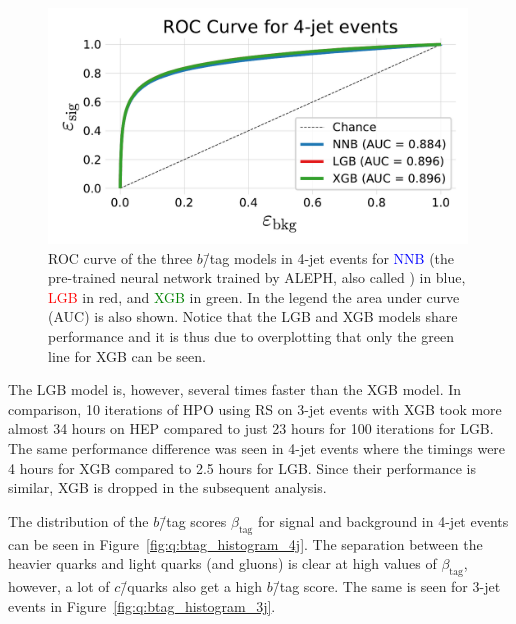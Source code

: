 \begin{figure}[h!]
  \vspace{-0.1cm}
  \centerfloat
  \includegraphics[width=0.99\textwidth, trim=10 10 10 40, clip]{figures/quarks/ROC_4_jet-down_sample=1.00-ML_vars=vertex-selection=b-ejet_min=4-n_iter_RS_lgb=99-n_iter_RS_xgb=9-cdot_cut=0.90-version=19.pdf}
  \caption[ROC curve for 4-jet $b$\=/tagging]
          {ROC curve of the three $b$\=/tag models in 4-jet events for \textcolor{blue}{NNB} (the pre-trained neural network trained by ALEPH, also called ) in blue, \textcolor{red}{LGB} in red, and \textcolor{green}{XGB} in green. In the legend the area under curve (AUC) is also shown. Notice that the LGB and XGB models share performance and it is thus due to overplotting that only the green line for XGB can be seen. 
          } 
  \label{fig:q:roc_btag_4j}
\end{figure}
\vspace{-0.3cm}

The LGB model is, however, several times faster than the XGB model. In comparison, \num{10} iterations of HPO using RS on 3-jet events with XGB took more almost \num{34} hours on HEP compared to just \num{23} hours for \num{100} iterations for LGB. The same performance difference was seen in 4-jet events where the timings were \num{4} hours for XGB compared to \num{2.5} hours for LGB. Since their performance is similar, XGB is dropped in the subsequent analysis. 

The distribution of the $b$\=/tag scores $\beta_\mathrm{tag}$ for signal and background in 4-jet events can be seen in Figure~\ref{fig:q:btag_histogram_4j}. The separation between the heavier quarks and light quarks (and gluons) is clear at high values of $\beta_\mathrm{tag}$, however, a lot of $c$\=/quarks also get a high $b$\=/tag score. The same is seen for 3-jet events in Figure~\ref{fig:q:btag_histogram_3j}. 

